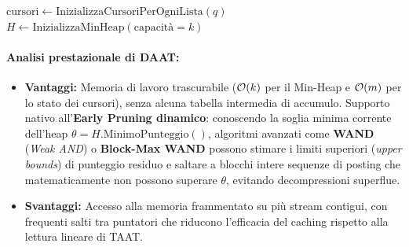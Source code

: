 \begin{algorithm}[H]
\caption{Document-at-a-Time (DAAT)}
\label{alg:daat}

$\text{cursori} \gets \text{InizializzaCursoriPerOgniLista}(q)$\;
$H \gets \text{InizializzaMinHeap}(\text{capacit\`a}=k)$\;

\;
\end{algorithm}

\paragraph{Analisi prestazionale di DAAT:}
\begin{itemize}
    \item \textbf{Vantaggi:} Memoria di lavoro trascurabile ($\mathcal{O}\!\left(k\right)$ per il Min-Heap e $\mathcal{O}\!\left(m\right)$ per lo stato dei cursori), senza alcuna tabella intermedia di accumulo. Supporto nativo all'\textbf{Early Pruning dinamico}: conoscendo la soglia minima corrente dell'heap $\theta = H.\text{MinimoPunteggio}()$, algoritmi avanzati come \textbf{WAND} (\textit{Weak AND}) o \textbf{Block-Max WAND} possono stimare i limiti superiori (\textit{upper bounds}) di punteggio residuo e saltare a blocchi intere sequenze di posting che matematicamente non possono superare $\theta$, evitando decompressioni superflue.
    \item \textbf{Svantaggi:} Accesso alla memoria frammentato su pi\`u stream contigui, con frequenti salti tra puntatori che riducono l'efficacia del caching rispetto alla lettura lineare di TAAT.
\end{itemize}

